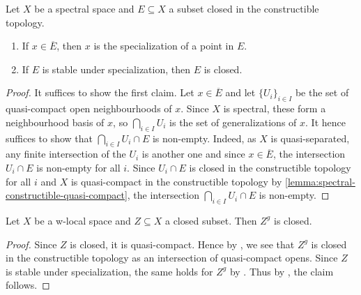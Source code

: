 \begin{lemma}[\stacksproject{0903}]
    \label{lemma:spectral-constructible-closed-closed}
    Let $X$ be a spectral space and $E \subseteq X$ a subset closed in the constructible topology.
    \begin{enumerate}
        \item If $x \in \overline{E}$, then $x$ is the specialization of a point in $E$.
        \item If $E$ is stable under specialization, then $E$ is closed. \label{item:specialization-closed-spectral-constructible-closed-closed}
    \end{enumerate}
    \leanok
\end{lemma}

\begin{proof}
    \leanok
    It suffices to show the first claim. Let $x \in \overline{E}$
    and let $\{U_i\}_{i \in I}$ be the set of quasi-compact open neighbourhoods of $x$.
    Since $X$ is spectral, these form a neighbourhood basis of $x$, so $\bigcap_{i \in  I} U_i$
    is the set of generalizations of $x$. It hence suffices to show
    that $\bigcap_{i \in  I} U_i \cap E$ is non-empty. Indeed,
    as $X$ is quasi-separated, any finite intersection of the $U_i$ is another one and
    since $x \in \overline{E}$, the intersection $U_i \cap E$ is non-empty for all $i$.
    Since $U_i \cap E$ is closed in the constructible topology for all $i$
    and $X$ is quasi-compact in the constructible topology by \ref{lemma:spectral-constructible-quasi-compact},
    the intersection $\bigcap_{i \in  I} U_i \cap E$ is non-empty.
\end{proof}

\begin{lemma}
    Let $X$ be a w-local space and $Z \subseteq X$ a closed subset. Then $Z^g$ is closed.
    \label{lemma:w-local-generalization-closed-closed}
    \leanok
\end{lemma}

\begin{proof}
    \leanok
    Since $Z$ is closed, it is quasi-compact. Hence by ,
    we see that $Z^g$ is closed in the constructible topology as an intersection of quasi-compact opens.
    Since $Z$ is stable under specialization, the same holds for $Z^g$ by
    . Thus
    by , the claim follows.
\end{proof}

